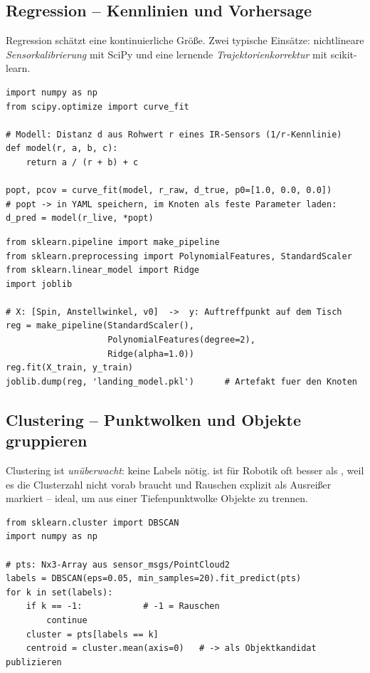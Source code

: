 \subsection{Regression -- Kennlinien und Vorhersage}
Regression schätzt eine kontinuierliche Größe. Zwei typische Einsätze:
nichtlineare \emph{Sensorkalibrierung} mit SciPy und eine lernende
\emph{Trajektorienkorrektur} mit scikit-learn.

\begin{lstlisting}[style=py,caption={Nichtlineare Kalibrierkurve mit SciPy curve\_fit}]
import numpy as np
from scipy.optimize import curve_fit

# Modell: Distanz d aus Rohwert r eines IR-Sensors (1/r-Kennlinie)
def model(r, a, b, c):
    return a / (r + b) + c

popt, pcov = curve_fit(model, r_raw, d_true, p0=[1.0, 0.0, 0.0])
# popt -> in YAML speichern, im Knoten als feste Parameter laden:
d_pred = model(r_live, *popt)
\end{lstlisting}

\begin{lstlisting}[style=py,caption={Polynomiale Regression (sklearn-Pipeline)}]
from sklearn.pipeline import make_pipeline
from sklearn.preprocessing import PolynomialFeatures, StandardScaler
from sklearn.linear_model import Ridge
import joblib

# X: [Spin, Anstellwinkel, v0]  ->  y: Auftreffpunkt auf dem Tisch
reg = make_pipeline(StandardScaler(),
                    PolynomialFeatures(degree=2),
                    Ridge(alpha=1.0))
reg.fit(X_train, y_train)
joblib.dump(reg, 'landing_model.pkl')      # Artefakt fuer den Knoten
\end{lstlisting}

\subsection{Clustering -- Punktwolken und Objekte gruppieren}
Clustering ist \emph{unüberwacht}: keine Labels nötig.  ist für
Robotik oft besser als , weil es die Clusterzahl nicht vorab
braucht und Rauschen explizit als Ausreißer markiert -- ideal, um aus einer
Tiefenpunktwolke Objekte zu trennen.

\begin{lstlisting}[style=py,caption={DBSCAN-Segmentierung einer Punktwolke}]
from sklearn.cluster import DBSCAN
import numpy as np

# pts: Nx3-Array aus sensor_msgs/PointCloud2
labels = DBSCAN(eps=0.05, min_samples=20).fit_predict(pts)
for k in set(labels):
    if k == -1:            # -1 = Rauschen
        continue
    cluster = pts[labels == k]
    centroid = cluster.mean(axis=0)   # -> als Objektkandidat publizieren
\end{lstlisting}


